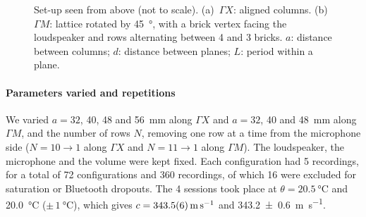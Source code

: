 \documentclass[9pt,a4paper,twocolumn]{extarticle}
\begin{document}
\begin{figure}[t]
{}
  \caption{Set-up seen from above (not to scale). (a)~$\Gamma X$: aligned columns. (b)~$\Gamma M$: lattice rotated by \SI{45}{\degree}, with a brick vertex facing the loudspeaker and rows alternating between 4 and 3 bricks. $a$: distance between columns; $d$: distance between planes; $L$: period within a plane.}
  \label{fig:setup}
\end{figure}

\paragraph{Parameters varied and repetitions}
We varied $a = 32$, 40, 48 and \SI{56}{\milli\metre} along $\Gamma X$ and $a = 32$, 40 and \SI{48}{\milli\metre} along $\Gamma M$, and the number of rows $N$, removing one row at a time from the microphone side ($N = 10 \to 1$ along $\Gamma X$ and $N = 11 \to 1$ along $\Gamma M$). The loudspeaker, the microphone and the volume were kept fixed. Each configuration had 5 recordings, for a total of 72 configurations and 360 recordings, of which 16 were excluded for saturation or Bluetooth dropouts. The 4 sessions took place at $\theta = \SI{20.5}{\celsius}$ and \SI{20.0}{\celsius} ($\pm\,\SI{1}{\celsius}$), which gives $c = \SI{343.5 \pm 0.6}{\metre\per\second}$ and \SI{343.2 \pm 0.6}{\metre\per\second}.
\end{document}
